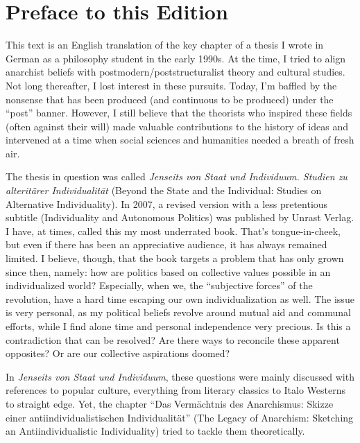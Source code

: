 
\vspace*{2.5cm}
\section*{Preface to this Edition}
\vspace*{4cm}

This text is an English translation of the key chapter of a thesis I wrote in
German as a philosophy student in the early 1990s. At the time, I tried to align
anarchist beliefs with postmodern/poststructuralist theory and cultural studies.
Not long thereafter, I lost interest in these pursuits. Today, I’m baffled by
the nonsense that has been produced (and continuous to be produced) under the
“post” banner. However, I still believe that the theorists who inspired these
fields (often against their will) made valuable contributions to the history
of ideas and intervened at a time when social sciences and humanities needed a
breath of fresh air.

The thesis in question was called \textit{Jenseits von Staat und Individuum.
Studien zu alteritärer Individualität} (Beyond the State and the Individual:
Studies on Alternative Individuality). In 2007, a revised version with a less
pretentious subtitle (Individuality and Autonomous Politics) was published by
Unrast Verlag. I have, at times, called this my most underrated book. That’s
tongue-in-cheek, but even if there has been an appreciative audience, it has
always remained limited. I believe, though, that the book targets a problem that
has only grown since then, namely: how are politics based on collective values
possible in an individualized world? Especially, when we, the “subjective
forces” of the revolution, have a hard time escaping our own individualization
as well. The issue is very personal, as my political beliefs revolve around
mutual aid and communal efforts, while I find alone time and personal
independence very precious. Is this a contradiction that can be resolved? Are
there ways to reconcile these apparent opposites? Or are our collective
aspirations doomed?

In \textit{Jenseits von Staat und Individuum}, these questions were mainly
discussed with references to popular culture, everything from literary classics
to Italo Westerns to straight edge. Yet, the chapter “Das Vermächtnis des
Anarchismus: Skizze einer antiindividualistischen Individualität” (The Legacy of
Anarchism: Sketching an Antiindividualistic Individuality) tried to tackle them
theoretically.

